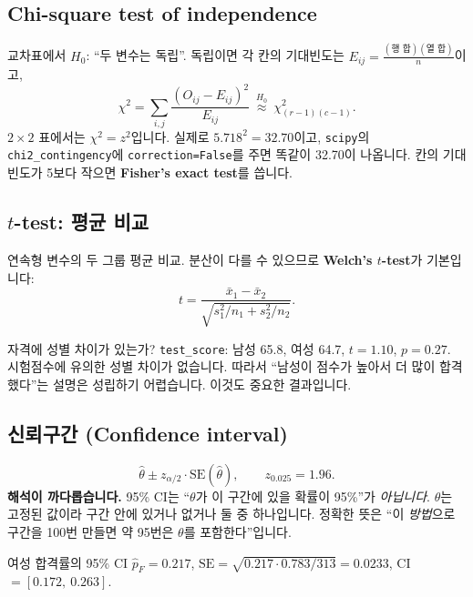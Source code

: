 \documentclass[11pt,a4paper]{article}
\newcommand{\term}[1]{\textbf{#1}}
\newcommand{\code}[1]{\texttt{#1}}
\begin{document}
\subsection{Chi-square test of independence}
교차표에서 $H_0$: ``두 변수는 독립''. 독립이면 각 칸의 기대빈도는 $E_{ij}=\frac{(\text{행 합})(\text{열 합})}{n}$이고,
\[
\chi^2=\sum_{i,j}\frac{(O_{ij}-E_{ij})^2}{E_{ij}}\ \overset{H_0}{\approx}\ \chi^2_{(r-1)(c-1)}.
\]
$2\times2$ 표에서는 $\chi^2=z^2$입니다. 실제로 $5.718^2=32.70$이고, \code{scipy}의 \code{chi2\_contingency}에 \code{correction=False}를 주면 똑같이 32.70이 나옵니다. 칸의 기대빈도가 5보다 작으면 \term{Fisher's exact test}를 씁니다.

\subsection{$t$-test: 평균 비교}
연속형 변수의 두 그룹 평균 비교. 분산이 다를 수 있으므로 \term{Welch's $t$-test}가 기본입니다:
\[
t=\frac{\bar x_1-\bar x_2}{\sqrt{s_1^2/n_1+s_2^2/n_2}}.
\]
\begin{databox}{자격에 성별 차이가 있는가?}
\code{test\_score}: 남성 65.8, 여성 64.7, $t=1.10$, $p=0.27$. 시험점수에 유의한 성별 차이가 없습니다. 따라서 ``남성이 점수가 높아서 더 많이 합격했다''는 설명은 성립하기 어렵습니다. 이것도 중요한 결과입니다.
\end{databox}

\subsection{신뢰구간 (Confidence interval)}
\[
\hat\theta\pm z_{\alpha/2}\cdot\mathrm{SE}(\hat\theta),\qquad z_{0.025}=1.96.
\]
\textbf{해석이 까다롭습니다.} 95\% CI는 ``$\theta$가 이 구간에 있을 확률이 95\%''가 \emph{아닙니다}. $\theta$는 고정된 값이라 구간 안에 있거나 없거나 둘 중 하나입니다. 정확한 뜻은 ``이 \emph{방법}으로 구간을 100번 만들면 약 95번은 $\theta$를 포함한다''입니다.

\begin{databox}{여성 합격률의 95\% CI}
$\hat p_F=0.217$, $\mathrm{SE}=\sqrt{0.217\cdot0.783/313}=0.0233$, CI $=[0.172,\ 0.263]$.
\end{databox}
\end{document}
